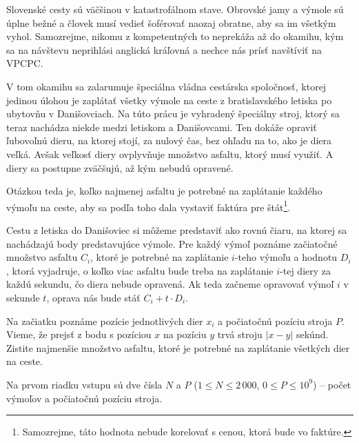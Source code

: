 





Slovenské cesty sú väčšinou v katastrofálnom stave. Obrovské jamy a výmole sú úplne bežné a človek
musí vedieť šoférovať naozaj obratne, aby sa im všetkým vyhol. Samozrejme, nikomu z kompetentných to
neprekáža až do okamihu, kým sa na návštevu neprihlási anglická kráľovná a nechce nás prísť
navštíviť na VPCPC.

V tom okamihu sa zalarumuje špeciálna vládna cestárska spoločnosť, ktorej jedinou úlohou je
zaplátať všetky výmole na ceste z bratislavského letiska po ubytovňu v Danišovciach. Na túto prácu
je vyhradený špeciálny stroj, ktorý sa teraz nachádza niekde medzi letiskom a Danišovcami. Ten
dokáže opraviť ľubovoľnú dieru, na ktorej stojí, za nulový čas, bez ohľadu na to, ako je diera veľká. Avšak veľkosť
diery ovplyvňuje množstvo asfaltu, ktorý musí využiť. A diery sa postupne zväčšujú, až kým nebudú
opravené.

Otázkou teda je, koľko najmenej asfaltu je potrebné na zaplátanie každého výmoľu na ceste, aby sa
podľa toho dala vystaviť faktúra pre štát\footnote{Samozrejme, táto hodnota nebude korelovať s
cenou, ktorá bude vo faktúre.}.


Cestu z letiska do Danišoviec si môžeme predstaviť ako rovnú čiaru, na ktorej sa nachádzajú body
predstavujúce výmole. Pre každý výmoľ poznáme začiatočné množstvo asfaltu $C_i$, ktoré je potrebné
na zaplátanie $i$-teho výmoľu a hodnotu $D_i$, ktorá vyjadruje, o koľko viac asfaltu bude treba na
zaplátanie $i$-tej diery za každú sekundu, čo diera nebude opravená. Ak teda začneme opravovať výmoľ
$i$ v sekunde $t$, oprava nás bude stáť $C_i + t \cdot D_i$.

Na začiatku poznáme pozície jednotlivých dier $x_i$ a počiatočnú pozíciu stroja $P$. Vieme, že
prejsť z bodu s pozíciou $x$ na pozíciu $y$ trvá stroju $|x-y|$ sekúnd. Zistite najmenšie množstvo
asfaltu, ktoré je potrebné na zaplátanie všetkých dier na ceste.


Na prvom riadku vstupu sú dve čísla $N$ a $P$ ($1 \le N \le 2\,000$, $0 \le P \le 10^9$) -- počet
výmoľov a počiatočnú pozíciu stroja.

